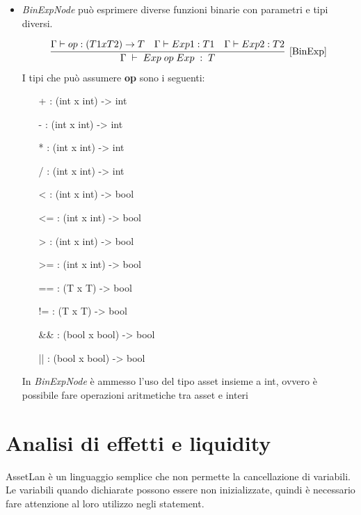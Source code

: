 \documentclass[12pt,twoside,openright,a4paper]{report}
\begin{document}
\begin{itemize}
    \item \textit{BinExpNode} può esprimere diverse funzioni binarie con parametri e tipi diversi.

    \begin{align*}
    \infer[\mathrm{[BinExp]}]
    { \Gamma \hspace{0.1cm} \vdash \hspace{0.1cm} Exp \hspace{0.1cm} op \hspace{0.1cm} Exp \hspace{0.1cm} : \hspace{0.1cm} T   } 
    { \Gamma \vdash op: (T1 x T2) \to T & \Gamma \vdash Exp1: T1 & \Gamma \vdash Exp2:T2}
    \end{align*}
     I tipi che può assumere \textbf{op} sono i seguenti:
    \begin{itemize}
        \item[+] : (int x int) -> int
        \item[-] : (int x int) -> int 
        \item[*] : (int x int) -> int 
        \item[/] : (int x int) -> int 
        \item[<] : (int x int) -> bool
        \item[<=]: (int x int) -> bool
        \item[>] : (int x int) -> bool
        \item[>=]: (int x int) -> bool
        \item[==]: (T x T) -> bool
        \item[!=]: (T x T) -> bool
        \item[\&\&]: (bool x bool) -> bool
        \item[||]: (bool x bool) -> bool
    \end{itemize}
    
    In \textit{BinExpNode} è ammesso l'uso del tipo asset insieme a int, ovvero è possibile fare operazioni aritmetiche tra asset e interi
\end{itemize}

\newpage
\section{Analisi di effetti e liquidity}
AssetLan è un linguaggio semplice che non permette la cancellazione di variabili. Le variabili quando dichiarate possono essere non inizializzate, quindi è necessario fare attenzione al loro utilizzo negli statement. 
\end{document}
